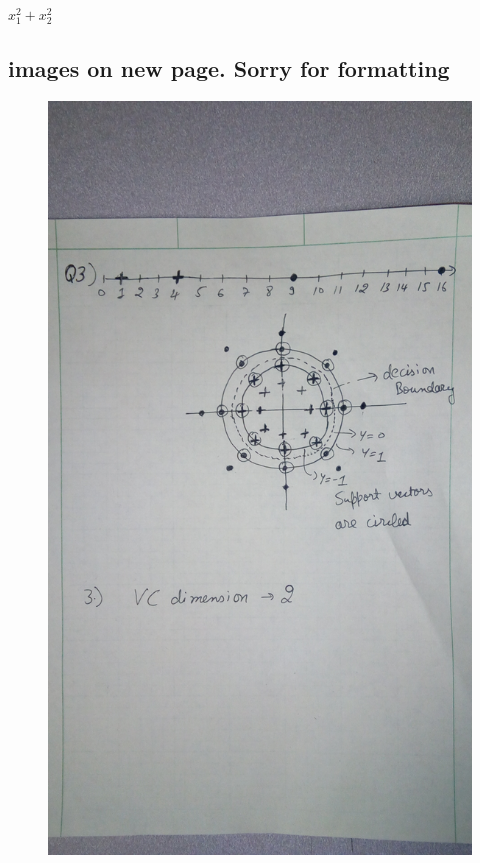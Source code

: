 \documentclass[fleqn]{article}
\begin{document}
	\section{}
	\begin{adjustwidth}{4em}{0pt}
		\subsection{}
		\begin{adjustwidth}{4em}{0pt}
			$x_1^2 + x_2^2$
		\end{adjustwidth}
		\subsection{images on new page. Sorry for formatting}
		\begin{figure}
			\centering
			\includegraphics[width=1\textwidth, angle=0]{hw9_q3.jpg}
		\end{figure}
	\end{adjustwidth}
	
\end{document}
